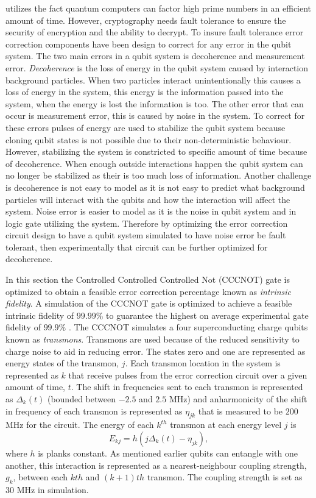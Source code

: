 utilizes the fact quantum computers can factor high prime numbers in an efficient amount of time. However, cryptography needs fault tolerance to ensure the security of encryption and the ability to decrypt.
To insure fault tolerance error correction components have been design to correct for any error in the qubit system. The two main errors in a qubit system is decoherence and measurement error. \textit{Decoherence} is the loss of energy in the qubit system caused by interaction background particles. When two particles interact unintentionally this causes a loss of energy in the system, this energy is the information passed into the system, when the energy is lost the information is
too. The other error that can occur is measurement error, this is caused by noise in the system. To correct for these errors pulses of energy are used to stabilize the qubit system because cloning qubit states is not possible due to their non-deterministic behaviour. However, stabilizing the system is constricted to specific amount of time because of decoherence. When enough outside interactions happen the qubit system can no longer be stabilized as their is too much loss of information.
Another challenge is decoherence is not easy to model as it is not easy to predict what background particles will interact with the qubits and how the interaction will affect the system. Noise error is easier to model as it is the noise in qubit system and in logic gate utilizing the system. Therefore by optimizing the error correction circuit design to have a qubit system simulated to have noise error be fault tolerant, then experimentally that circuit can be further optimized for decoherence.

In this section the Controlled Controlled Controlled Not (CCCNOT) gate is optimized to obtain a feasible error correction percentage known as \textit{intrinsic fidelity}. A simulation of the CCCNOT gate is optimized to achieve a feasible intrinsic fidelity of $99.99\%$ to guarantee the highest on average experimental gate fidelity of $99.9\%$ \cite{Barends2014}. The CCCNOT simulates a four superconducting charge qubits known as \textit{transmons}. Transmons are used because of the reduced sensitivity to charge
noise to aid in reducing error. The states zero and one are represented as energy states of the transmon, $j$. Each transmon location in the system is represented as $k$ that receive pulses from the error correction circuit over a given amount of time, $t$. The shift in frequencies sent to each transmon is represented as $\Delta_k(t)$ (bounded between $-2.5$ and $2.5$ MHz) and anharmonicity of the shift in frequency of each transmon is represented as $\eta_{jk}$ that is measured to be $200$ MHz for the circuit. The
energy of each $k^{th}$ transmon at each energy level $j$ is
\begin{equation}
    \label{eq:energy}
    E_{kj} = h(j\Delta_k(t)-\eta_{jk}),
\end{equation}
where $h$ is planks constant. As mentioned earlier qubits can entangle with one another, this interaction is represented as a nearest-neighbour coupling strength, $g_k$, between each $kth$ and $(k+1)th$ transmon. The coupling strength is set as $30$ MHz in simulation.  

